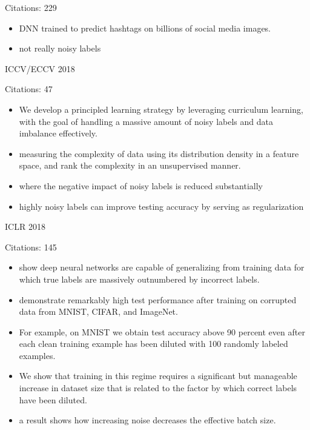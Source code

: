 \documentclass[11pt]{article}
\begin{document}
\noindent Citations: 229

\begin{itemize}
\item DNN trained to predict hashtags on billions of social media images.
\item not really noisy labels
\end{itemize}

\vspace{2cm}

\noindent ICCV/ECCV 2018

\noindent Citations: 47

\begin{itemize}
\item We develop a principled learning strategy by leveraging curriculum learning, with the goal of handling a massive amount of noisy labels and data imbalance effectively.
\item measuring the complexity of data using its distribution density in a feature space, and rank the complexity in an unsupervised manner.
\item where the negative impact of noisy labels is reduced substantially
\item highly noisy labels can improve testing accuracy by serving as regularization
\end{itemize}

\vspace{2cm}

\noindent ICLR 2018

\noindent Citations: 145

\begin{itemize}
\item show deep neural networks are capable of generalizing from training data for which true labels are massively outnumbered by incorrect labels.
\item demonstrate remarkably high test performance after training on corrupted data from MNIST, CIFAR, and ImageNet.
\item For example, on MNIST we obtain test accuracy above 90 percent even after each clean training example has been diluted with 100 randomly labeled examples.
\item We show that training in this regime requires a significant but manageable increase in dataset size that is related to the factor by which correct labels have been diluted.
\item a result shows how increasing noise decreases the effective batch size.
\end{itemize}
\end{document}
